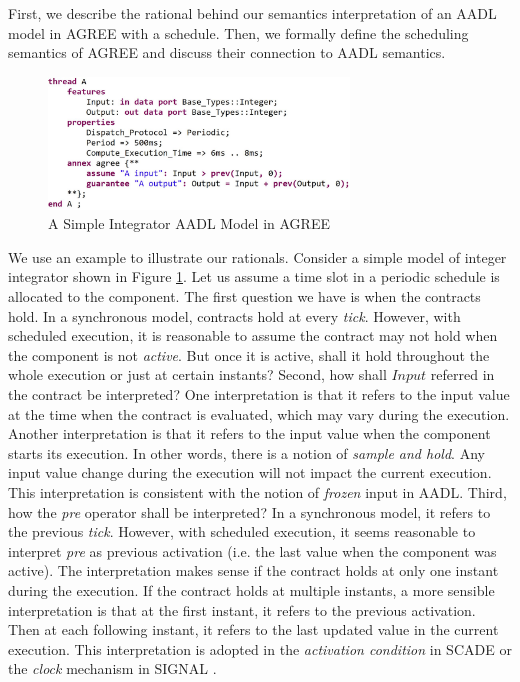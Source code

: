
First, we describe the rational behind our semantics interpretation of an AADL model in AGREE with a schedule. Then, we formally define the scheduling semantics of AGREE and discuss their connection to AADL semantics.

\begin{figure}[ht!]
\centering
\includegraphics[width=80mm]{pre.jpg}
\caption{A Simple Integrator AADL Model in AGREE\label{integratorFig}}
\end{figure}

We use an example to illustrate our rationals. Consider a simple model of integer integrator shown in Figure \ref{integratorFig}. Let us assume a time slot in a periodic schedule is allocated to the component.  
The first question we have is when the contracts hold. In a synchronous model, contracts hold at every \emph{tick}. However, with scheduled execution, it is reasonable to assume the contract may not hold when the component is not \emph{active}. But once it is active, shall it hold throughout the whole execution or just at certain instants? Second, how shall $Input$ referred in the contract be interpreted? One interpretation is that it refers to the input value at the time when the contract is evaluated, which may vary during the execution. Another interpretation is that it refers to the input value when the component starts its execution. In other words, there is a notion of \emph{sample and hold}. Any input value change during the execution will not impact the current execution. This interpretation is consistent with the notion of \emph{frozen} input in AADL. Third, how the \emph{pre} operator shall be interpreted? In a synchronous model, it refers to the previous \emph{tick}. However, with scheduled execution, it seems reasonable to interpret \emph{pre} as previous activation (i.e. the last value when the component was active). The interpretation makes sense if the contract holds at only one instant during the execution. If the contract holds at multiple instants, a more sensible interpretation is that at the first instant, it refers to the previous activation. Then at each following instant, it refers to the last updated value in the current execution. This interpretation is adopted in the \emph{activation condition} in SCADE \cite{scade} or the \emph{clock} mechanism in SIGNAL \cite{signal}.

